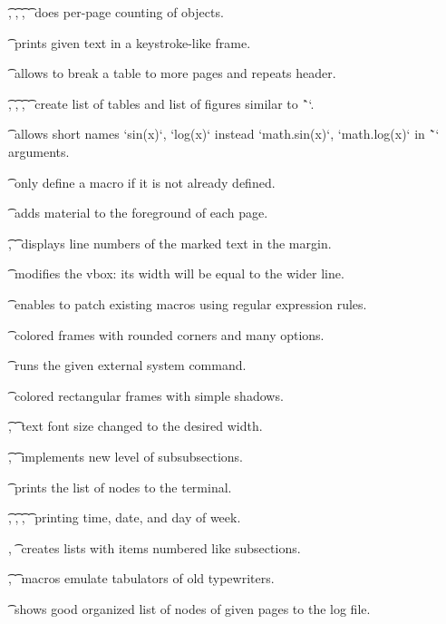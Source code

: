 {{\tpg[perpage]\t\incrpp, \t\thepp, \t\thepplast, \t\truepage\
does per-page counting of objects.

\tpg[keystrokes]\t\keystroke\
prints given text in a keystroke-like frame.

\tpg[longtable]\t\longtable\
allows to break a table to more pages and repeats header.

\tpg[lot]\t\makeLOF, \t\makeLOT, \t\captionF, \t\captionT\
create list of tables and list of figures similar to \^`\maketoc`.

\tpg[mathinexpr]\t\mathinexpr\ allows short names `sin(x)`, `log(x)`
instead `math.sin(x)`, `math.log(x)` in \~`\expr` arguments.

\tpg[onlyifnew]\t\onlyifnew\
only define a macro if it is not already defined.

\tpg[pgforeground]\t\pgforeground\
adds material to the foreground of each page.

\tpg[linnum]\t\pstart, \t\pend\
displays line numbers of the marked text in the margin.

\tpg[rebox]\t\rebox\
modifies the vbox: its width will be equal to the wider line.

\tpg[replmacro]\t\replmacro\
enables to patch existing macros using regular expression rules.

\tpg[roundframe]\t\roundframe\
colored frames with rounded corners and many options.

\tpg[runsystem]\t\runsystem\
runs the given external system command.

\tpg[shadedframe]\t\shadedframe\
colored rectangular frames with simple shadows.

\tpg[scaleto]\t\scaleto, \t\scaletof\
text font size changed to the desired width.

\tpg[seccc]\t\seccc, \t\iniseccc\
implements new level of subsubsections.

\tpg[shownodes]\t\shownodes\
prints the list of nodes to the terminal.

\tpg[dayw]\t\sethours, \t\setminutes, \t\setseconds, \t\setweekday\
printing time, date, and day of week.

\tpg[multilist]\ea\ulink{}, \t\keepstyle\
creates lists with items numbered like subsections.

\tpg[tabs]\t\settabs, \t\tabs\
macros emulate tabulators of old typewriters.

\tpg[pglists]\t\showpglists\
shows good organized list of nodes of given pages to the log file.

}}
